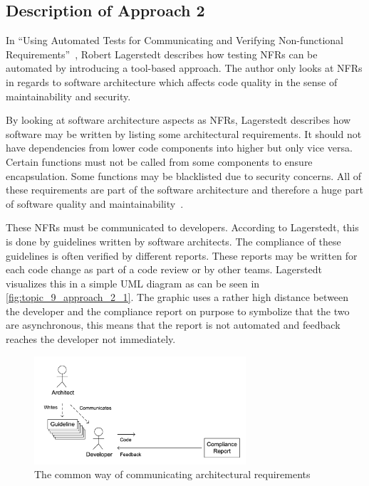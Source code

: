 \subsection{Description of Approach 2}

In \enquote{Using Automated Tests for Communicating and Verifying Non-functional Requirements}~\cite{Lagerstedt2014}, Robert Lagerstedt describes how testing NFRs can be automated by introducing a tool-based approach.
The author only looks at NFRs in regards to software architecture which affects code quality in the sense of maintainability and security.

By looking at software architecture aspects as NFRs, Lagerstedt describes how software may be written by listing some architectural requirements.
It should not have dependencies from lower code components into higher but only vice versa.
Certain functions must not be called from some components to ensure encapsulation. Some functions may be blacklisted due to security concerns.
All of these requirements are part of the software architecture and therefore a huge part of software quality and maintainability~\cite{Lagerstedt2014}.

These NFRs must be communicated to developers. According to Lagerstedt, this is done by guidelines written by software architects.
The compliance of these guidelines is often verified by different reports. These reports may be written for each code change as part of a code review or by other teams.
Lagerstedt visualizes this in a simple UML diagram as can be seen in
\autoref{fig:topic_9_approach_2_1}.
The graphic uses a rather high distance between the developer and the compliance report on purpose to symbolize that the two are asynchronous, this means that the report is not automated and feedback reaches the developer not immediately.

\begin{figure}[htbp]
	\centering
	\includegraphics[width=0.7\textwidth]{../images/topic_9_approach_2_1.png}
	\caption{The common way of communicating architectural requirements~\cite{Lagerstedt2014}}
	\label{fig:topic_9_approach_2_1}
\end{figure}

